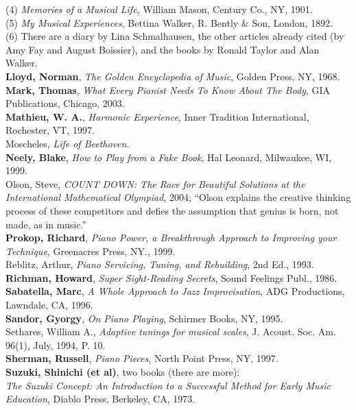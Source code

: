 (4) \textit{Memories of a Musical Life}, William Mason, Century Co., NY, 1901.\\
(5) \textit{My Musical Experiences}, Bettina Walker, R. Bently \& Son, London, 1892.\\
(6) There are a diary by Lina Schmalhausen, the other articles already cited (by Amy Fay and August Boissier), and the books by Ronald Taylor and Alan Walker.\\
\textbf{Lloyd, Norman}, \textit{The Golden Encyclopedia of Music}, Golden Press, NY, 1968.\\
\textbf{Mark, Thomas}, \textit{What Every Pianist Needs To Know About The Body}, GIA Publications, Chicago, 2003.\\
\textbf{Mathieu, W. A.}, \textit{Harmonic Experience}, Inner Tradition International, Rochester, VT, 1997.\\
Moscheles, \textit{Life of Beethoven}.\\
\textbf{Neely, Blake}, \textit{How to Play from a Fake Book}, Hal Leonard, Milwaukee, WI, 1999.\\
Olson, Steve, \textit{COUNT DOWN: The Race for Beautiful Solutions at the International Mathematical Olympiad}, 2004; “Olson explains the creative thinking process of these competitors and defies the assumption that genius is born, not made, as in music.”\\
\textbf{Prokop, Richard}, \textit{Piano Power, a Breakthrough Approach to Improving your Technique}, Greenacres Press, NY., 1999.\\
Reblitz, Arthur, \textit{Piano Servicing, Tuning, and Rebuilding}, 2nd Ed., 1993.\\
\textbf{Richman, Howard}, \textit{Super Sight-Reading Secrets}, Sound Feelings Publ., 1986.\\ \textbf{Sabatella, Marc}, \textit{A Whole Approach to Jazz Improvisation}, ADG Productions,\\ Lawndale, CA, 1996.\\
\textbf{Sandor, Gyorgy}, \textit{On Piano Playing}, Schirmer Books, NY, 1995.\\
Sethares, William A., \textit{Adaptive tunings for musical scales}, J. Acoust. Soc. Am. 96(1), July, 1994, P. 10.\\
\textbf{Sherman, Russell}, \textit{Piano Pieces}, North Point Press, NY, 1997.\\
\textbf{Suzuki, Shinichi (et al)}, two books (there are more):\\
\textit{The Suzuki Concept: An Introduction to a Successful Method for Early Music Education}, Diablo Press, Berkeley, CA, 1973.\\
